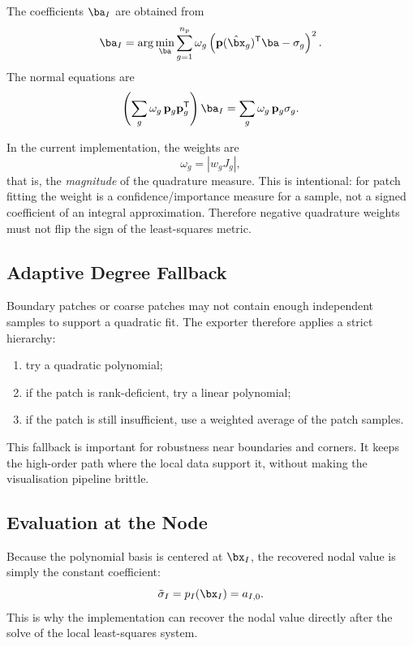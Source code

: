 The coefficients $\ba_I$ are obtained from
\begin{equation}
  \ba_I
  = \arg\min_{\ba}
    \sum_{g=1}^{n_p} \omega_g
    \left(
      \mathbf{p}(\hat{\bx}_g)^{\mathsf{T}}\ba - \sigma_g
    \right)^2.
\end{equation}
The normal equations are
\begin{equation}
  \left(
    \sum_g \omega_g\, \mathbf{p}_g \mathbf{p}_g^{\mathsf{T}}
  \right)\ba_I
  =
  \sum_g \omega_g\, \mathbf{p}_g \sigma_g.
\end{equation}

In the current implementation, the weights are
\begin{equation}
  \omega_g = |w_g J_g|,
\end{equation}
that is, the \emph{magnitude} of the quadrature measure.  This is intentional:
for patch fitting the weight is a confidence/importance measure for a sample,
not a signed coefficient of an integral approximation.  Therefore negative
quadrature weights must not flip the sign of the least-squares metric.

\subsection{Adaptive Degree Fallback}

Boundary patches or coarse patches may not contain enough independent samples
to support a quadratic fit.  The exporter therefore applies a strict
hierarchy:
\begin{enumerate}[nosep]
  \item try a quadratic polynomial;
  \item if the patch is rank-deficient, try a linear polynomial;
  \item if the patch is still insufficient, use a weighted average of the
        patch samples.
\end{enumerate}

This fallback is important for robustness near boundaries and corners.  It
keeps the high-order path where the local data support it, without making the
visualisation pipeline brittle.

\subsection{Evaluation at the Node}

Because the polynomial basis is centered at $\bx_I$, the recovered nodal value
is simply the constant coefficient:
\begin{equation}
  \tilde{\sigma}_I = p_I(\bx_I) = a_{I,0}.
\end{equation}
This is why the implementation can recover the nodal value directly after the
solve of the local least-squares system.


